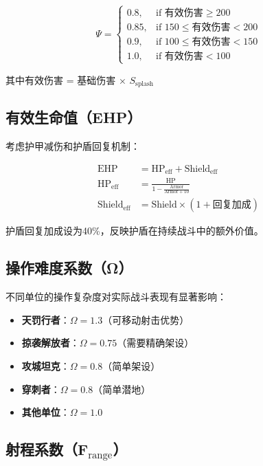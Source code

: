\documentclass[a4paper,12pt]{article}
\begin{document}
\begin{equation}
\Psi = \begin{cases}
0.8, & \text{if 有效伤害} \geq 200 \\
0.85, & \text{if } 150 \leq \text{有效伤害} < 200 \\
0.9, & \text{if } 100 \leq \text{有效伤害} < 150 \\
1.0, & \text{if 有效伤害} < 100
\end{cases}
\end{equation}

其中有效伤害 = 基础伤害 × $S_{\text{splash}}$

\subsection{有效生命值（EHP）}

考虑护甲减伤和护盾回复机制：

\begin{align}
\text{EHP} &= \text{HP}_{\text{eff}} + \text{Shield}_{\text{eff}} \\
\text{HP}_{\text{eff}} &= \frac{\text{HP}}{1 - \frac{\text{Armor}}{\text{Armor}+10}} \\
\text{Shield}_{\text{eff}} &= \text{Shield} \times (1 + \text{回复加成})
\end{align}

护盾回复加成设为40\%，反映护盾在持续战斗中的额外价值。

\subsection{操作难度系数（Ω）}

不同单位的操作复杂度对实际战斗表现有显著影响：

\begin{itemize}
    \item \textbf{天罚行者}：$\Omega = 1.3$（可移动射击优势）
    \item \textbf{掠袭解放者}：$\Omega = 0.75$（需要精确架设）
    \item \textbf{攻城坦克}：$\Omega = 0.8$（简单架设）
    \item \textbf{穿刺者}：$\Omega = 0.8$（简单潜地）
    \item \textbf{其他单位}：$\Omega = 1.0$
\end{itemize}

\subsection{射程系数（F$_{\text{range}}$）}
\end{document}

